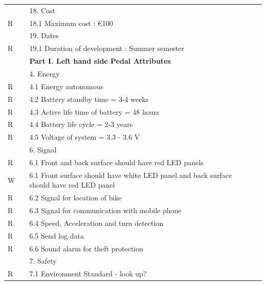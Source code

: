 \documentclass{article}
\begin{document}
\begin{longtable}{|C{1cm}|C{2cm}|L{9.56cm}|L{4cm}|}
		\hline
		& & 18. Cost & \\
		R & & \hspace{1mm} 18.1 Maximum cost : \euro 100 & \\
		\hline
		& & 19. Dates & \\
		R & & \hspace{1mm} 19.1 Duration of development : Summer semester & \\		 
		\hline
		& & \textbf{Part I. Left hand side Pedal Attributes} & \\
		\hline
		& & 4. Energy & \\
		R & & \hspace{1mm} 4.1 Energy autonomous & \\
		R & & \hspace{1mm} 4.2 Battery standby time = 3-4 weeks & \\
		R & & \hspace{1mm} 4.3 Active life time of battery = 48 hours & \\
		R & & \hspace{1mm} 4.4 Battery life cycle = 2-3 years & \\
		R & & \hspace{1mm} 4.5 Voltage of system = 3.3 - 3.6 V & \\
		\hline
		& & 6. Signal & \\
		R & & \hspace{1mm} 6.1 Front and back surface should have red LED panels  &  \\
		W & & \hspace{1mm} 6.1 Front  surface should have white LED panel and back surface should have red LED panel  &  \\
		R & & \hspace{1mm} 6.2 Signal for location of bike & \\
		R & & \hspace{1mm} 6.3 Signal for communication with mobile phone & \\
		R & & \hspace{1mm} 6.4 Speed, Acceleration and turn detection & \\
		R & & \hspace{1mm} 6.5 Send log data & \\
		R & & \hspace{1mm} 6.6 Sound alarm for theft protection & \\
		\hline
		& & 7. Safety & \\
		R & & \hspace{1mm} 7.1 Environment Standard - look up? & \\

\end{longtable}
\end{document}
